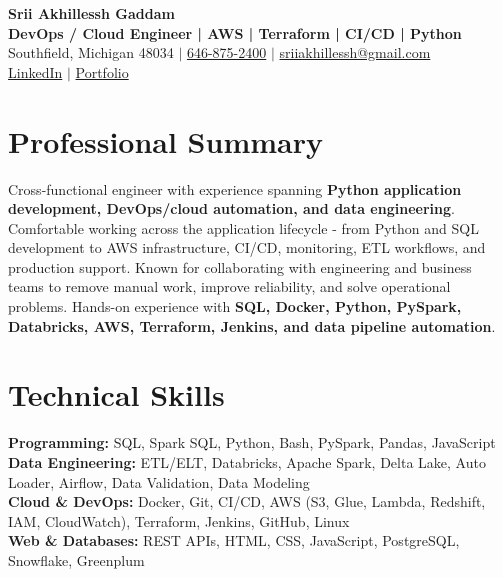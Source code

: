 \documentclass[letterpaper,10pt]{article}
\begin{document}
\fontsize{9.35pt}{10.45pt}\selectfont

\begin{center}
    {\LARGE \textbf{Srii Akhillessh Gaddam}} \\[-1pt]
    \textbf{DevOps / Cloud Engineer | AWS | Terraform | CI/CD | Python} \\[2pt]
    Southfield, Michigan 48034 $|$
    \href{tel:6468752400}{646-875-2400} $|$
    \href{mailto:sriiakhillessh@gmail.com}{sriiakhillessh@gmail.com} \\[1pt]
    \href{https://www.linkedin.com/in/srii-akhiilessh-gaddam-b48668191/}{LinkedIn} $|$
    \href{https://sriiakhillesshg.github.io/portfolio/}{Portfolio}
\end{center}
\vspace{-8pt}

\section{Professional Summary}
\small{Cross-functional engineer with experience spanning \textbf{Python application development, DevOps/cloud automation, and data engineering}. Comfortable working across the application lifecycle - from Python and SQL development to AWS infrastructure, CI/CD, monitoring, ETL workflows, and production support. Known for collaborating with engineering and business teams to remove manual work, improve reliability, and solve operational problems. Hands-on experience with \textbf{SQL, Docker, Python, PySpark, Databricks, AWS, Terraform, Jenkins, and data pipeline automation}.}

\section{Technical Skills}
\small{
\textbf{Programming:} SQL, Spark SQL, Python, Bash, PySpark, Pandas, JavaScript \\
\textbf{Data Engineering:} ETL/ELT, Databricks, Apache Spark, Delta Lake, Auto Loader, Airflow, Data Validation, Data Modeling \\
\textbf{Cloud \& DevOps:} Docker, Git, CI/CD, AWS (S3, Glue, Lambda, Redshift, IAM, CloudWatch), Terraform, Jenkins, GitHub, Linux \\
\textbf{Web \& Databases:} REST APIs, HTML, CSS, JavaScript, PostgreSQL, Snowflake, Greenplum
}
\end{document}
